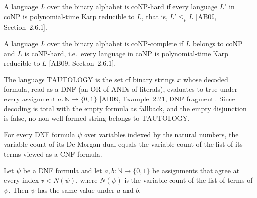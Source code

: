 \begin{definition}
\label{Complexity.coNPHard}
\leanok
{}
A language $L$ over the binary alphabet is coNP-hard if every language
$L'$ in coNP is polynomial-time Karp reducible to $L$, that is,
$L' \le_p L$ [AB09, Section~2.6.1].
\end{definition}

\begin{definition}
\label{Complexity.coNPComplete}
\leanok
{}
A language $L$ over the binary alphabet is coNP-complete if $L$ belongs
to coNP and $L$ is coNP-hard, i.e.\ every language in
coNP is polynomial-time Karp reducible to $L$ [AB09, Section~2.6.1].
\end{definition}

\begin{definition}
\label{Complexity.TAUTOLOGY}
\leanok
{}
The language $\mathrm{TAUTOLOGY}$ is the set of binary strings $x$ whose decoded
formula, read as a DNF (an OR of ANDs of literals), evaluates to true under every
assignment $a : \mathbb{N} \to \{0,1\}$ [AB09, Example~2.21, DNF fragment]. Since
decoding is total with the empty formula as fallback, and the empty disjunction is
false, no non-well-formed string belongs to $\mathrm{TAUTOLOGY}$.
\end{definition}

\begin{lemma}
\label{Complexity.taut_numVars_dual}
\leanok
{}
For every DNF formula $\psi$ over variables indexed by the natural numbers, the variable
count of its De Morgan dual equals the variable count of the list of its terms viewed as
a CNF formula.
\end{lemma}

\begin{lemma}
\label{Complexity.taut_eval_congr}
\leanok
{}
Let $\psi$ be a DNF formula and let $a,b:\mathbb{N}\to\{0,1\}$ be assignments that agree
at every index $v<N(\psi)$, where $N(\psi)$ is the variable count of the list of terms
of $\psi$. Then $\psi$ has the same value under $a$ and $b$.
\end{lemma}

